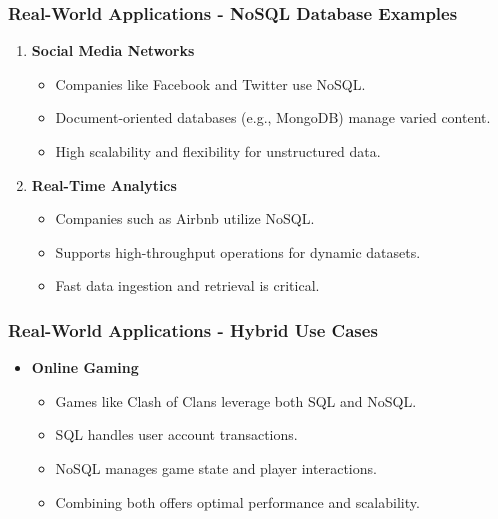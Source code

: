 \documentclass[aspectratio=169]{beamer}
\begin{document}
\begin{frame}[fragile]
    \frametitle{Real-World Applications - NoSQL Database Examples}
    \begin{enumerate}
        \item \textbf{Social Media Networks}
            \begin{itemize}
                \item Companies like Facebook and Twitter use NoSQL.
                \item Document-oriented databases (e.g., MongoDB) manage varied content.
                \item High scalability and flexibility for unstructured data.
            \end{itemize}
        \item \textbf{Real-Time Analytics}
            \begin{itemize}
                \item Companies such as Airbnb utilize NoSQL.
                \item Supports high-throughput operations for dynamic datasets.
                \item Fast data ingestion and retrieval is critical.
            \end{itemize}
    \end{enumerate}
\end{frame}

\begin{frame}[fragile]
    \frametitle{Real-World Applications - Hybrid Use Cases}
    \begin{itemize}
        \item \textbf{Online Gaming}
            \begin{itemize}
                \item Games like Clash of Clans leverage both SQL and NoSQL.
                \item SQL handles user account transactions.
                \item NoSQL manages game state and player interactions.
                \item Combining both offers optimal performance and scalability.
            \end{itemize}
    \end{itemize}
\end{frame}
\end{document}
